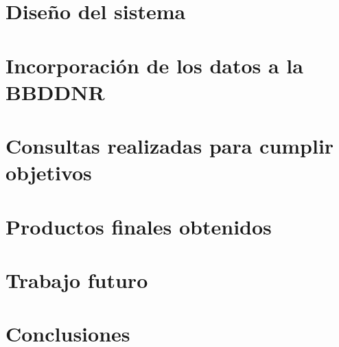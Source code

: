 \documentclass[spanish]{article}
\begin{document}
\section{Diseño del sistema}

\section{Incorporación de los datos a la BBDDNR}

\section{Consultas realizadas para cumplir objetivos}

\section{Productos finales obtenidos}

\section{Trabajo futuro}

\section{Conclusiones}
\end{document}
